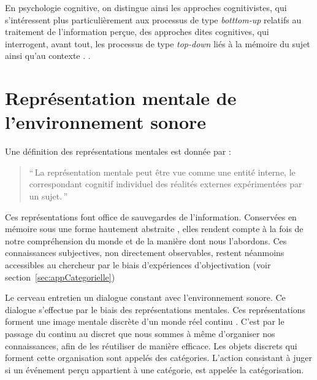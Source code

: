 En psychologie cognitive, on distingue ainsi les approches cognitivistes, qui s'intéressent plus particulièrement aux processus de type \emph{botttom-up} relatifs au traitement de l'information perçue, des approches dites cognitives, qui interrogent, avant tout, les processus de type \emph{top-down} liés à la mémoire du sujet ainsi qu'au contexte \citep[p. ??]{guastavino_etude_2003}.
.

\section{Représentation mentale de l'environnement sonore}

Une définition des représentations mentales est donnée par \citep{houde1998vocabulaire}:

\begin{quote}
``\,La représentation mentale peut être vue comme une entité interne, le correspondant cognitif individuel des réalités externes expérimentées par un sujet.\,''
\end{quote}

Ces représentations font office de sauvegardes de l'information. Conservées en mémoire sous une forme hautement abstraite \citep[p. ??]{mcadams1994penser}, elles rendent compte à la fois de notre compréhension du monde et de la manière dont nous l'abordons. Ces connaissances subjectives, non directement observables, restent néanmoins accessibles au chercheur par le biais d'expériences d'objectivation (voir section~\ref{sec:appCategorielle})
 

Le cerveau entretien un dialogue constant avec l'environnement sonore. Ce dialogue s'effectue par le biais des représentations mentales. Ces représentations forment une image mentale discrète d'un monde réel continu \citep{houde1998vocabulaire}. C'est par le passage du continu au discret que nous sommes à même d'organiser nos connaissances, afin de les réutiliser de manière efficace. Les objets discrets qui forment cette organisation sont appelés des catégories. L'action consistant à juger si un événement perçu appartient à une catégorie, est appelée la catégorisation.

